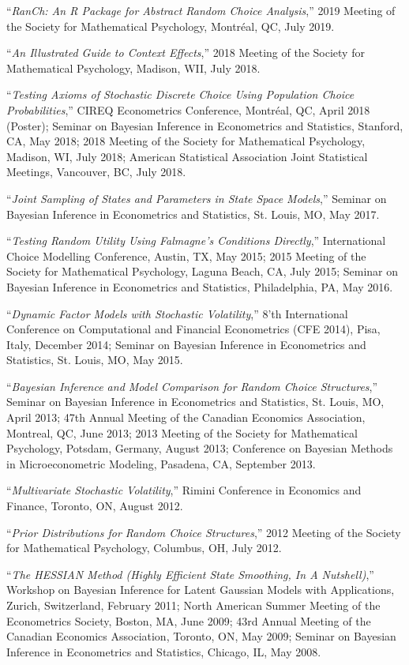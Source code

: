 \documentclass[12pt]{article}
\begin{document}
``{\it RanCh: An R Package for Abstract Random Choice Analysis},''
2019 Meeting of the Society for Mathematical Psychology,
Montr\'eal, QC,
July 2019.

``{\it An Illustrated Guide to Context Effects},''
2018 Meeting of the Society for Mathematical Psychology,
Madison, WII,
July 2018.

``{\it Testing Axioms of Stochastic Discrete Choice Using Population Choice Probabilities},''
CIREQ Econometrics Conference,
Montr\'eal, QC,
April 2018 (Poster);
Seminar on Bayesian Inference in Econometrics and Statistics,
Stanford, CA,
May 2018;
2018 Meeting of the Society for Mathematical Psychology,
Madison, WI,
July 2018;
American Statistical Association Joint Statistical Meetings,
Vancouver, BC,
July 2018.

``{\it Joint Sampling of States and Parameters in State Space Models},''
Seminar on Bayesian Inference in Econometrics and Statistics,
St. Louis, MO,
May 2017.

``{\it Testing Random Utility Using Falmagne's Conditions Directly},''
International Choice Modelling Conference,
Austin, TX,
May 2015;
2015 Meeting of the Society for Mathematical Psychology,
Laguna Beach, CA,
July 2015;
Seminar on Bayesian Inference in Econometrics and Statistics,
Philadelphia, PA,
May 2016.

``{\it Dynamic Factor Models with Stochastic Volatility},''
8'th International Conference on Computational and Financial Econometrics (CFE 2014),
Pisa, Italy,
December 2014;
Seminar on Bayesian Inference in Econometrics and Statistics,
St. Louis, MO,
May 2015.

``{\it Bayesian Inference and Model Comparison for Random Choice Structures},''
Seminar on Bayesian Inference in Econometrics and Statistics,
St. Louis, MO,
April 2013;
47th Annual Meeting of the Canadian Economics Association,
Montreal, QC,
June 2013;
2013 Meeting of the Society for Mathematical Psychology,
Potsdam, Germany,
August 2013;
Conference on Bayesian Methods in Microeconometric Modeling,
Pasadena, CA,
September 2013.

``{\it Multivariate Stochastic Volatility},''
Rimini Conference in Economics and Finance,
Toronto, ON,
August 2012.

``{\it Prior Distributions for Random Choice Structures},''
2012 Meeting of the Society for Mathematical Psychology,
Columbus, OH,
July 2012.

``{\it The HESSIAN Method (Highly Efficient State Smoothing, In A Nutshell)},''
Workshop on Bayesian Inference for Latent Gaussian Models with Applications,
Zurich, Switzerland,
February 2011;
North American Summer Meeting of the Econometrics Society,
Boston, MA,
June 2009;
43rd Annual Meeting of the Canadian Economics Association,
Toronto, ON,
May 2009;
Seminar on Bayesian Inference in Econometrics and Statistics,
Chicago, IL,
May 2008.
\end{document}
